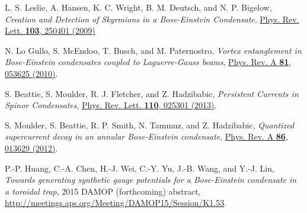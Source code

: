 \documentclass[twocolumn,pra,unsortedaddress,showpacs,floatfix,citeautoscript,nofootinbib]{revtex4-1}
\begin{document}
\begin{thebibliography}{99}
 L. S. Leslie, A. Hansen, K. C. Wright, B. M. Deutsch,
and N. P. Bigelow, \emph{Creation and Detection of Skyrmions in a
Bose-Einstein Condensate}, \href{http://dx.doi.org/10.1103/PhysRevLett.103.250401}{
Phys. Rev. Lett. \textbf{103}, 250401 (2009)}

 N. Lo Gullo, S. McEndoo, T. Busch, and M. Paternostro, \emph{Vortex entanglement in Bose-Einstein
condensates coupled to Laguerre-Gauss beams},
\href{http://dx.doi.org/10.1103/PhysRevA.81.053625}{Phys. Rev. A
\textbf{81}, 053625 (2010)}.

 S. Beattie, S. Moulder, R. J. Fletcher, and Z.
Hadzibabic, \emph{Persistent Currents in Spinor Condensates}, \href{http://dx.doi.org/10.1103/PhysRevLett.110.025301}{Phys.
Rev. Lett. \textbf{110}, 025301 (2013)}.

 S. Moulder, S. Beattie, R. P. Smith, N. Tammuz, and Z.
Hadzibabic, \emph{Quantized supercurrent decay in an annular Bose-Einstein condensate}, \href{http://dx.doi.org/10.1103/PhysRevA.86.013629}{Phys. Rev. A
\textbf{86}, 013629 (2012)}.

 P.-P. Huang, C.-A. Chen, H.-J. Wei, C.-Y. Yu, J.-B. Wang,
and Y.-J. Lin, \emph{Towards generating synthetic gauge potentials
for a Bose-Einstein condensate in a toroidal trap}, 2015 DAMOP
(forthcoming) abstract,
\href{http://meetings.aps.org/Meeting/DAMOP15/Session/K1.53}{http://meetings.aps.org/Meeting/DAMOP15/Session/K1.53}.

\end{thebibliography}
\end{document}
